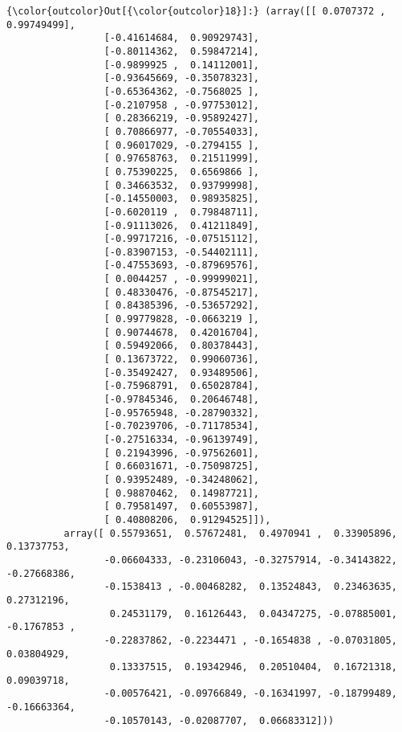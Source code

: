 \documentclass[11pt]{article}
\begin{document}
\begin{Verbatim}[commandchars=\\\{\}]
{\color{outcolor}Out[{\color{outcolor}18}]:} (array([[ 0.0707372 ,  0.99749499],
                 [-0.41614684,  0.90929743],
                 [-0.80114362,  0.59847214],
                 [-0.9899925 ,  0.14112001],
                 [-0.93645669, -0.35078323],
                 [-0.65364362, -0.7568025 ],
                 [-0.2107958 , -0.97753012],
                 [ 0.28366219, -0.95892427],
                 [ 0.70866977, -0.70554033],
                 [ 0.96017029, -0.2794155 ],
                 [ 0.97658763,  0.21511999],
                 [ 0.75390225,  0.6569866 ],
                 [ 0.34663532,  0.93799998],
                 [-0.14550003,  0.98935825],
                 [-0.6020119 ,  0.79848711],
                 [-0.91113026,  0.41211849],
                 [-0.99717216, -0.07515112],
                 [-0.83907153, -0.54402111],
                 [-0.47553693, -0.87969576],
                 [ 0.0044257 , -0.99999021],
                 [ 0.48330476, -0.87545217],
                 [ 0.84385396, -0.53657292],
                 [ 0.99779828, -0.0663219 ],
                 [ 0.90744678,  0.42016704],
                 [ 0.59492066,  0.80378443],
                 [ 0.13673722,  0.99060736],
                 [-0.35492427,  0.93489506],
                 [-0.75968791,  0.65028784],
                 [-0.97845346,  0.20646748],
                 [-0.95765948, -0.28790332],
                 [-0.70239706, -0.71178534],
                 [-0.27516334, -0.96139749],
                 [ 0.21943996, -0.97562601],
                 [ 0.66031671, -0.75098725],
                 [ 0.93952489, -0.34248062],
                 [ 0.98870462,  0.14987721],
                 [ 0.79581497,  0.60553987],
                 [ 0.40808206,  0.91294525]]),
          array([ 0.55793651,  0.57672481,  0.4970941 ,  0.33905896,  0.13737753,
                 -0.06604333, -0.23106043, -0.32757914, -0.34143822, -0.27668386,
                 -0.1538413 , -0.00468282,  0.13524843,  0.23463635,  0.27312196,
                  0.24531179,  0.16126443,  0.04347275, -0.07885001, -0.1767853 ,
                 -0.22837862, -0.2234471 , -0.1654838 , -0.07031805,  0.03804929,
                  0.13337515,  0.19342946,  0.20510404,  0.16721318,  0.09039718,
                 -0.00576421, -0.09766849, -0.16341997, -0.18799489, -0.16663364,
                 -0.10570143, -0.02087707,  0.06683312]))
\end{Verbatim}
            
\end{document}
